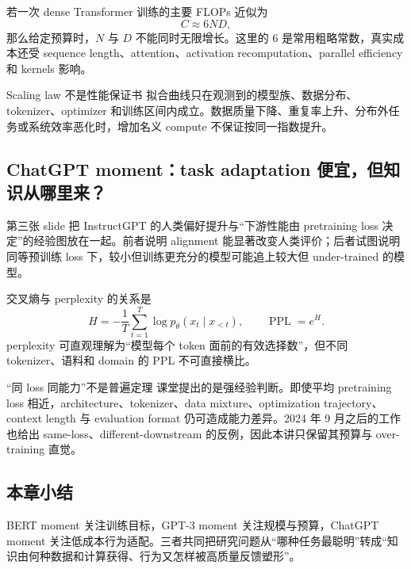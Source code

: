 
若一次 dense Transformer 训练的主要 FLOPs 近似为
\[
C\approx 6ND,
\]
那么给定预算时，$N$ 与 $D$ 不能同时无限增长。这里的 $6$ 是常用粗略常数，真实成本还受 sequence length、attention、activation recomputation、parallel efficiency 和 kernels 影响。

\begin{warningbox}{Scaling law 不是性能保证书}
拟合曲线只在观测到的模型族、数据分布、tokenizer、optimizer 和训练区间内成立。数据质量下降、重复率上升、分布外任务或系统效率恶化时，增加名义 compute 不保证按同一指数提升。
\end{warningbox}


\subsection{ChatGPT moment：task adaptation 便宜，但知识从哪里来？}

第三张 slide 把 InstructGPT 的人类偏好提升与“下游性能由 pretraining loss 决定”的经验图放在一起。前者说明 alignment 能显著改变人类评价；后者试图说明同等预训练 loss 下，较小但训练更充分的模型可能追上较大但 under-trained 的模型。


交叉熵与 perplexity 的关系是
\[
H=-\frac{1}{T}\sum_{t=1}^{T}\log p_\theta(x_t\mid x_{<t}),
\qquad
\operatorname{PPL}=e^H.
\]
perplexity 可直观理解为“模型每个 token 面前的有效选择数”，但不同 tokenizer、语料和 domain 的 PPL 不可直接横比。

\begin{warningbox}{“同 loss 同能力”不是普遍定理}
课堂提出的是强经验判断。即使平均 pretraining loss 相近，architecture、tokenizer、data mixture、optimization trajectory、context length 与 evaluation format 仍可造成能力差异。2024 年 9 月之后的工作也给出 same-loss、different-downstream 的反例，因此本讲只保留其预算与 over-training 直觉。
\end{warningbox}


\subsection{本章小结}

BERT moment 关注训练目标，GPT-3 moment 关注规模与预算，ChatGPT moment 关注低成本行为适配。三者共同把研究问题从“哪种任务最聪明”转成“知识由何种数据和计算获得、行为又怎样被高质量反馈塑形”。

